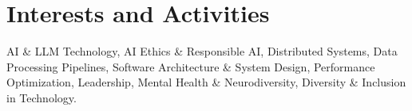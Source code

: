 
\section{Interests and Activities}
\footnotesize{AI \& LLM Technology, AI Ethics \& Responsible AI, Distributed Systems, Data Processing Pipelines, Software Architecture \& System Design, Performance Optimization, Leadership, Mental Health \& Neurodiversity, Diversity \& Inclusion in Technology.}